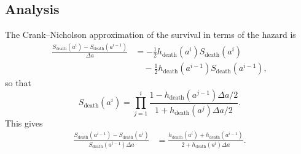 \documentclass[12pt]{article}
\begin{document}
\subsection{Analysis}

The Crank--Nicholson approximation of the survival in terms of the
hazard is
\begin{equation}
  \begin{split}
    \frac{S_{\text{death}}(a^i) - S_{\text{death}}(a^{i - 1})}
    {\Delta a}
    &= - \frac{1}{2} h_{\text{death}}(a^i) S_{\text{death}}(a^i)
    \\ &\quad {}
    - \frac{1}{2} h_{\text{death}}(a^{i - 1}) S_{\text{death}}(a^{i - 1}),
  \end{split}
\end{equation}
so that
\begin{equation}
  S_{\text{death}}(a^i)
  = \prod_{j = 1}^i
  \frac{1 - h_{\text{death}}(a^{j - 1}) \Delta a / 2}
  {1 + h_{\text{death}}(a^j) \Delta a / 2}.
\end{equation}
This gives
\begin{equation}
  \begin{split}
    \frac{S_{\text{death}}(a^{i - 1}) - S_{\text{death}}(a^i)}
    {S_{\text{death}}(a^{i - 1}) \Delta a}
    &= \frac{h_{\text{death}}(a^i) + h_{\text{death}}(a^{i - 1})}
    {2 + h_{\text{death}}(a^i) \Delta a}.
  \end{split}
\end{equation}
\end{document}
